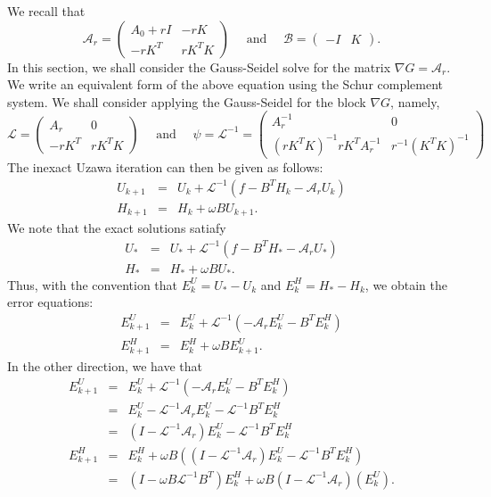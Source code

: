 We recall that 
\begin{equation}
\mathcal{A}_r = \begin{pmatrix} 
A_0 + rI & - rK \\ -rK^T & rK^TK 
\end{pmatrix} 
\quad \mbox{ and } \quad 
\mathcal{B} = \begin{pmatrix} 
-I & K \end{pmatrix}. 
\end{equation} 
In this section, we shall consider the Gauss-Seidel solve for the matrix $ \nabla G = \mathcal{A}_r$. We write an equivalent form of the above equation using the Schur complement system. We shall consider applying the Gauss-Seidel for the block $\nabla G$, namely, 
\begin{equation}
\mathcal{L} = \begin{pmatrix}
A_r & 0\\
-r K^T & rK^T K 
\end{pmatrix} 
\quad \mbox{ and } \quad \psi = \mathcal{L}^{-1} = \begin{pmatrix}
A_r^{-1} & 0\\
(rK^T K)^{-1} rK^T A_r^{-1} & r^{-1} (K^T K)^{-1} 
\end{pmatrix} 
\end{equation}
The inexact Uzawa iteration can then be given as follows: 
\begin{eqnarray}
U_{k+1} &=& U_k + \mathcal{L}^{-1} (f - B^T H_k - \mathcal{A}_r U_k) \\
H_{k+1} &=& H_k + \omega B U_{k+1}. 
\end{eqnarray}
We note that the exact solutions satiafy \begin{eqnarray}
U_{*} &=& U_{*} + \mathcal{L}^{-1} (f - B^T H_{*} - \mathcal{A}_r U_{*}) \\
H_{*} &=& H_{*} + \omega B U_{*}. 
\end{eqnarray}
Thus, with the convention that $E_{k}^U = U_* - U_k$ and $E_{k}^H = H_* - H_k$, we obtain the error equations: 
\begin{eqnarray}
E^U_{k+1} &=& E^U_k + \mathcal{L}^{-1} (- \mathcal{A}_r E^U_k - B^T E^H_k) \\
E^H_{k+1} &=& E^H_k + \omega B E^U_{k+1}. 
\end{eqnarray}
In the other direction, we have that 
\begin{eqnarray}
E^U_{k+1} &=& E^U_k + \mathcal{L}^{-1} (- \mathcal{A}_r  E^U_k - B^T E^H_k) \\
          &=& E^U_k - \mathcal{L}^{-1} \mathcal{A}_r E^U_k - \mathcal{L}^{-1} B^T E^H_k \\
          &=& (I - \mathcal{L}^{-1} \mathcal{A}_r) E^U_k - \mathcal{L}^{-1} B^T E_k^H \\ 
E^H_{k+1} &=& E^H_k + \omega B ((I - \mathcal{L}^{-1} \mathcal{A}_r) E^U_k - \mathcal{L}^{-1} B^T E_k^H ) \\
&=& (I - \omega B \mathcal{L}^{-1} B^T) E_k^H + \omega B (I - \mathcal{L}^{-1} \mathcal{A}_r)(E_k^U). 
\end{eqnarray} 
